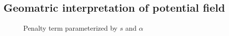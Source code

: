 \documentclass[12pt]{article}
\begin{document}
\subsection*{Geomatric interpretation of potential field}
\begin{figure}[h!]
\begin{centering}
\par\end{centering}
\caption{Penalty term parameterized by $s$ and $\alpha$ }
\end{figure} 
 




 
\end{document}
